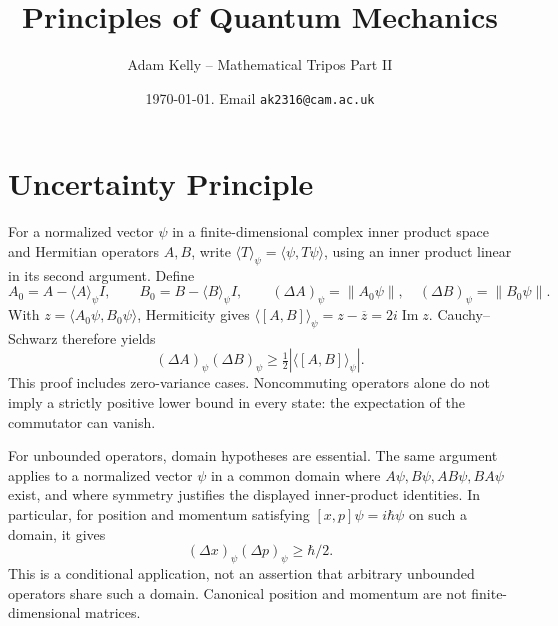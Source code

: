\documentclass[a4paper, 10pt, twocolumn]{amsart}
\title{Principles of Quantum Mechanics}
\author{Adam Kelly -- Mathematical Tripos Part II}
\date{\today. Email \texttt{ak2316@cam.ac.uk}}
\begin{document}
\maketitle

\section{Uncertainty Principle}

For a normalized vector $\psi$ in a finite-dimensional complex inner product space and Hermitian operators $A,B$, write $\langle T\rangle_\psi=\langle\psi,T\psi\rangle$, using an inner product linear in its second argument. Define
\[
A_0=A-\langle A\rangle_\psi I,\qquad B_0=B-\langle B\rangle_\psi I,
\qquad (\Delta A)_\psi=\|A_0\psi\|,\quad (\Delta B)_\psi=\|B_0\psi\|.
\]
With $z=\langle A_0\psi,B_0\psi\rangle$, Hermiticity gives
$\langle[A,B]\rangle_\psi=z-\overline z=2i\operatorname{Im}z$.
Cauchy--Schwarz therefore yields
\[
(\Delta A)_\psi(\Delta B)_\psi\geq\tfrac12|\langle[A,B]\rangle_\psi|.
\]
This proof includes zero-variance cases. Noncommuting operators alone do not imply a strictly positive lower bound in every state: the expectation of the commutator can vanish.

For unbounded operators, domain hypotheses are essential. The same argument applies to a normalized vector $\psi$ in a common domain where $A\psi,B\psi,AB\psi,BA\psi$ exist, and where symmetry justifies the displayed inner-product identities. In particular, for position and momentum satisfying $[x,p]\psi=i\hbar\psi$ on such a domain, it gives
\[
(\Delta x)_\psi(\Delta p)_\psi\geq\hbar/2.
\]
This is a conditional application, not an assertion that arbitrary unbounded operators share such a domain. Canonical position and momentum are not finite-dimensional matrices.
\end{document}
